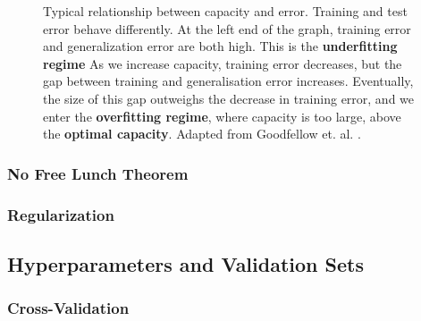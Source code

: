 \begin{figure}[htp]
    \centering
    
    \captionsetup{format=hang} %
    \caption{
        Typical relationship between capacity and error. Training and test error
        behave differently. At the left end of the graph, training error and
        generalization error are both high. This is the \textbf{underfitting
        regime} As we increase capacity, training error decreases, but the gap
        between training and generalisation error increases. Eventually, the
        size of this gap outweighs the decrease in training error, and we enter
        the \textbf{overfitting regime}, where capacity is too large, above the
        \textbf{optimal capacity}. Adapted from Goodfellow et. al.
        \cite{Goodfellow-et-al-2016}.
    }
    \label{fig:capacity}
\end{figure}

\subsubsection{No Free Lunch Theorem}

\subsubsection{Regularization}

\subsection{Hyperparameters and Validation Sets}



\subsubsection{Cross-Validation}

